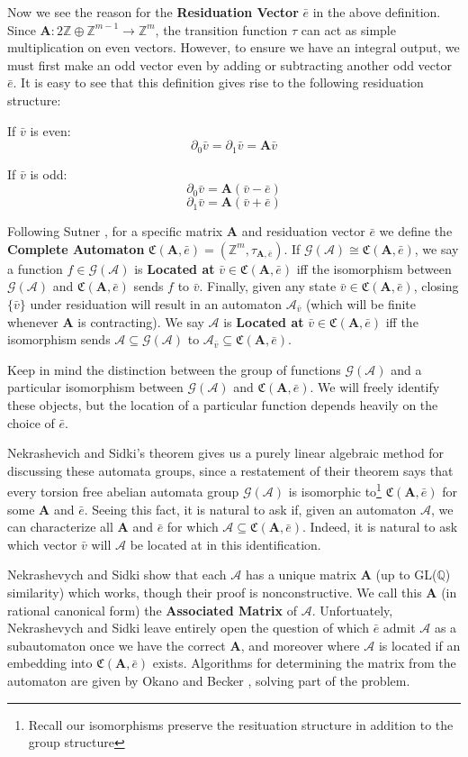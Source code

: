 \documentclass[final]{ws-ijac}
\newcommand{\A}{\mathcal{A}}
\newcommand{\G}{\mathcal{G}}
\newcommand{\C}{\mathfrak{C}(\Am,\e)}
\newcommand{\Z}{\mathbb{Z}}
\newcommand{\Q}{\mathbb{Q}}
\newcommand{\2}{\textbf{2}}
\newcommand{\Am}{\textbf{A}}
\newcommand{\del}{\partial}
\newcommand{\vv}{\bar{v}}
\newcommand{\e}{\bar{e}}
\begin{document}
Now we see the reason for the \textbf{Residuation Vector} $\e$ in the 
above definition. Since $\Am : 2\Z \oplus \Z^{m-1} \to \Z^m$, the transition
function $\tau$ can act as simple multiplication on even vectors. However,
to ensure we have an integral output, we must first make an odd vector 
even by adding or subtracting another odd vector $\e$. It is easy to see 
that this definition gives rise to the following residuation structure:

If $\vv$ is even:
\[ \del_0 \vv = \del_1 \vv = \Am \vv \]

If $\vv$ is odd:
\[ \del_0 \vv = \Am (\vv - \e) \]
\[ \del_1 \vv = \Am (\vv + \e) \]

\noindent
Following Sutner \cite{Sutner18:abelian_automata}, for a specific matrix
$\Am$ and residuation vector $\e$ we define the \textbf{Complete Automaton} 
$\C = (\Z^m, \tau_{\Am,\e})$. If $\G(\A) \cong \C$, we say a 
function $f \in \G(\A)$ is \textbf{Located at} $\vv \in \C$ iff the isomorphism 
between $\G(\A)$ and $\C$ sends $f$ to $\vv$. Finally, given any 
state $\vv \in \C$, closing $\{ \vv \}$ under residuation will result in an
automaton $\A_{\vv}$ (which will be finite whenever $\Am$ is contracting). 
We say $\A$ is \textbf{Located at} $\vv \in \C$ iff the isomorphism sends 
$\A \subseteq \G(\A)$ to $\A_{\vv} \subseteq \C$. 

Keep in mind the distinction between the group of functions $\G(\A)$
and a particular isomorphism between $\G(\A)$ and $\C$. We will freely
identify these objects, but the location of a particular function
depends heavily on the choice of $\e$.

Nekrashevich and Sidki's theorem gives us a purely linear algebraic method
for discussing these automata groups, since a restatement of their theorem 
says that every torsion free abelian automata group $\G(\A)$ is isomorphic 
to\footnote{Recall our isomorphisms preserve the resituation structure in addition to the group structure} 
$\C$ for some $\Am$ and $\e$. Seeing this fact, it is natural to ask if,
given an automaton $\A$, we can characterize all $\Am$ and $\e$ for which 
$\A \subseteq \C$. Indeed, it is natural to ask which vector $\vv$ will $\A$
be located at in this identification.

Nekrashevych and Sidki show that each $\A$ 
has a unique matrix $\Am$ (up to GL($\Q$) similarity) which works, though
their proof is nonconstructive. We call this $\Am$ (in rational canonical form)
the \textbf{Associated Matrix} of $\A$. Unfortuately, Nekrashevych and Sidki 
leave entirely open the question of which $\e$ admit $\A$ as a subautomaton
once we have the correct $\Am$, and moreover where $\A$ is located
if an embedding into $\C$ exists. Algorithms for determining the matrix from
the automaton are given by Okano \cite{Okano15:thesis} 
and Becker \cite{Becker18:thesis}, solving part of the problem. 
\end{document}

